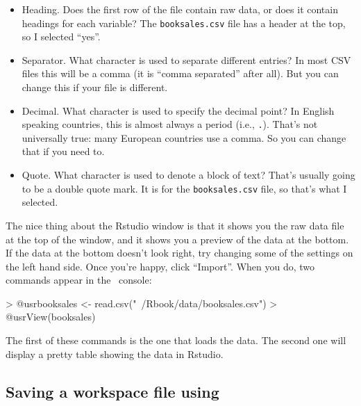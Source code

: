 \begin{itemize}
\item Heading. Does the first row of the file contain raw data, or does it contain headings for each variable? The \texttt{booksales.csv} file has a header at the top, so I selected ``yes''.
\item Separator. What character is used to separate different entries? In most CSV files this will be a comma (it is ``comma separated'' after all). But you can change this if your file is different. 
\item Decimal. What character is used to specify the decimal point? In English speaking countries, this is almost always a period (i.e., \texttt{.}). That's not universally true: many European countries use a comma. So you can change that if you need to.
\item Quote. What character is used to denote a block of text? That's usually going to be a double quote mark. It is for the \texttt{booksales.csv} file, so that's what I selected.
\end{itemize}
The nice thing about the Rstudio window is that it shows you the raw data file at the top of the window, and it shows you a preview of the data at the bottom. If the data at the bottom doesn't look right, try changing some of the settings on the left hand side. Once you're happy, click ``Import''. When you do, two commands appear in the \R\ console:
\begin{rblock1}
> @usr{booksales <- read.csv("~/Rbook/data/booksales.csv")}
> @usr{View(booksales)}
\end{rblock1}
The first of these commands is the one that loads the data. The second one will display a pretty table showing the data in Rstudio. 


\subsection{Saving a workspace file using \R\label{sec:save}}

